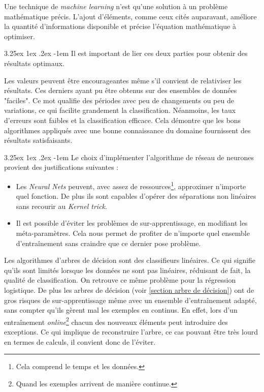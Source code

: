 \documentclass[a4paper, 11pt]{article}
\makeatletter
\renewcommand\paragraph{\@startsection{paragraph}{5}{\z@}%
  {3.25ex \@plus1ex \@minus.2ex}%
  {-1em}%
  {\normalfont\normalsize\bfseries}}
\makeatother
\begin{document}
Une technique de \textit{machine learning} n'est qu'une solution à un problème mathématique précis. L'ajout d'éléments,
comme ceux cités auparavant, améliore la quantité d'informations disponible et précise l'équation mathématique à optimiser.

\paragraph{}
Il est important de lier ces deux parties pour obtenir des résultats optimaux.

Les valeurs peuvent être encourageantes même s'il convient de relativiser les résultats. Ces derniers ayant pu
être obtenus sur des ensembles de données "faciles". Ce mot qualifie des périodes avec peu de changements ou peu de
variations, ce qui facilite grandement la classification.
Néanmoins, les taux d'erreurs sont faibles et la classification efficace.
Cela démontre que les bons algorithmes appliqués avec une bonne connaissance du domaine fournissent des résultats satisfaisants. 

\paragraph{}
Le choix d'implémenter l'algorithme de réseau de neurones provient des justifications suivantes :
\begin{itemize}
 \item Les \textit{Neural Nets} peuvent, avec assez de ressources\footnote{Cela comprend le temps et les données.}, approximer n'importe
 quel fonction. De plus ils sont capables d'opérer des séparations non linéaires sans recourir au \textit{Kernel trick}.
 \item Il est possible d'éviter les problèmes de sur-apprentissage, en modifiant les méta-paramètres. Cela nous permet de profiter
 de n'importe quel ensemble d'entraînement sans craindre que ce dernier pose problème.
\end{itemize}

Les algorithmes d'arbres de décision sont des classifieurs linéaires. Ce qui signifie qu'ils sont limités
lorsque les données ne sont pas linéaires, réduisant de fait, la qualité de classification. On retrouve ce même problème
pour la régression logistique. De plus les arbres de décision (voir \ref{section arbre de décision}) ont de gros risques
de sur-apprentissage même avec un ensemble d'entraînement adapté, sans compter qu'ils gèrent mal les exemples en continus.
En effet, lors d'un entraînement \textit{online}\footnote{Quand les exemples arrivent de manière continue.} chacun des nouveaux
éléments peut introduire des exceptions. Ce qui implique de reconstruire l'arbre, ce cas pouvant être très lourd en termes
de calculs, il convient donc de l'éviter.
\end{document}
